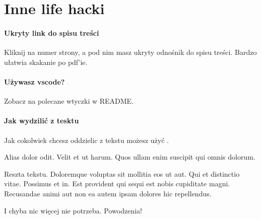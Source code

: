 \section{Inne life hacki}

\paragraph{Ukryty link do spisu treści}
Kliknij na numer strony, a pod nim masz ukryty odnośnik do spisu treści. Bardzo ułatwia skakanie po pdf'ie.

\paragraph{Używasz vscode?}
Zobacz na polecane wtyczki w README.

\paragraph{Jak wydzilić z tesktu}
Jak cokolwiek chcesz oddzielic z tekstu możesz użyć .

\begin{onepage}[1cm]
    \centering
    Alias dolor odit. Velit et ut harum. Quos ullam enim suscipit qui omnis dolorum.
\end{onepage}

Reszta tekstu.
Doloremque voluptas sit mollitia eos ut aut. Qui et distinctio vitae. Possimus et in. Est provident qui sequi est nobis cupiditate magni. Recusandae animi aut non ea autem ipsam dolores hic repellendus.

I chyba nic więcej nie potrzeba. Powodzenia!
